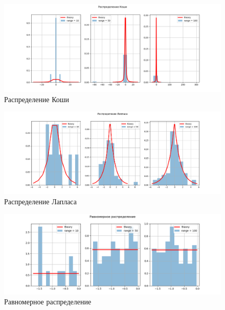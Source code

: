 \documentclass[12pt]{article}
\begin{document}
\begin{figure}[h!]
\begin{center}
\includegraphics[width=\textwidth]{caushi.png}
\caption{Распределение Коши}
\end{center}
\end{figure}

\pagebreak

\begin{figure}[h!]
\begin{center}
\includegraphics[width=\textwidth]{laplace.png}
\caption{Распределение Лапласа}
\end{center}
\end{figure}

\begin{figure}[h!]
\begin{center}
\includegraphics[width=\textwidth]{uniform.png}
\caption{Равномерное распределение}
\end{center}
\end{figure}
\end{document}
